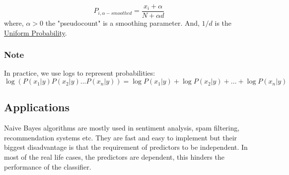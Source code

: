 \documentclass[12pt, A4]{report}
\begin{document}
	\begin{equation}
		P_{i, \alpha-smoothed} = \frac{x_i+\alpha}{N+\alpha d}
	\end{equation}
	where, $\alpha > 0$ the "pseudocount" is a smoothing parameter. And, $1/d$ is the \href{https://en.wikipedia.org/wiki/Discrete_uniform_distribution}{Uniform Probability}.

	\subsubsection*{Note}
	In practice, we use logs to represent probabilities:
	\begin{equation}
		\log{(P(x_1|y)P(x_2|y)...P(x_n|y))} = \log{P(x_1|y)} + \log{P(x_2|y)} +...+ \log{P(x_n|y)}
	\end{equation}


\subsection*{Applications}
	Naive Bayes algorithms are mostly used in sentiment analysis, spam filtering, recommendation systems etc. They are fast and easy to implement but their biggest disadvantage is that the requirement of predictors to be independent. In most of the real life cases, the predictors are dependent, this hinders the performance of the classifier.
\end{document}
